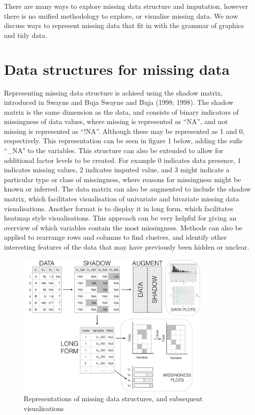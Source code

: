 \documentclass[]{article}
\begin{document}
There are many ways to explore missing data structure and imputation,
however there is no unified methodology to explore, or visualise missing
data. We now discuss ways to represent missing data that fit in with the
grammar of graphics and tidy data.

\section{Data structures for missing
data}\label{data-structures-for-missing-data}

Representing missing data structure is achieed using the shadow matrix,
introduced in Swayne and Buja Swayne and Buja (1998; 1998). The shadow
matrix is the same dimension as the data, and consists of binary
indicators of missingness of data values, where missing is represented
as ``NA'', and not missing is represented as ``!NA''. Although these may
be represented as 1 and 0, respectively. This representation can be seen
in figure 1 below, adding the sufic ``\_NA" to the variables. This
structure can also be extended to allow for additional factor levels to
be created. For example 0 indicates data presence, 1 indicates missing
values, 2 indicates imputed value, and 3 might indicate a particular
type or class of missingness, where reasons for missingness might be
known or inferred. The data matrix can also be augmented to include the
shadow matrix, which facilitates visualisation of univariate and
bivariate missing data visualisations. Another format is to display it
in long form, which facilitates heatmap style visualisations. This
approach can be very helpful for giving an overview of which variables
contain the most missingness. Methods can also be applied to rearrange
rows and columns to find clusters, and identify other interesting
features of the data that may have previously been hidden or unclear.

\begin{figure}[h]
\centering
\includegraphics[width=270pt]{diagram.png}
\caption{Representations of missing data structures, and subsequent visualisations}
\end{figure}
\end{document}
